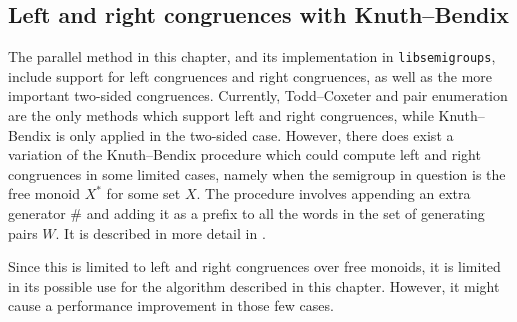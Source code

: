 \subsection{Left and right congruences with Knuth--Bendix}
\label{sec:kb-l-r}
The parallel method in this chapter, and its implementation in
\texttt{libsemigroups}, include support for left congruences and right
congruences, as well as the more important two-sided congruences.  Currently,
Todd--Coxeter and pair enumeration are the only methods which support left and
right congruences, while Knuth--Bendix is only applied in the two-sided case.
However, there does exist a variation of the Knuth--Bendix procedure which could
compute left and right congruences in some limited cases, namely when the
semigroup in question is the free monoid $X^*$ for some set $X$.  The procedure
involves appending an extra generator $\#$ and adding it as a prefix to all the
words in the set of generating pairs $W$.  It is described in more detail in
\cite[\S 2.8]{sims}.

Since this is limited to left and right congruences over free monoids, it is
limited in its possible use for the algorithm described in this chapter.
However, it might cause a performance improvement in those few cases.


\clearpage
